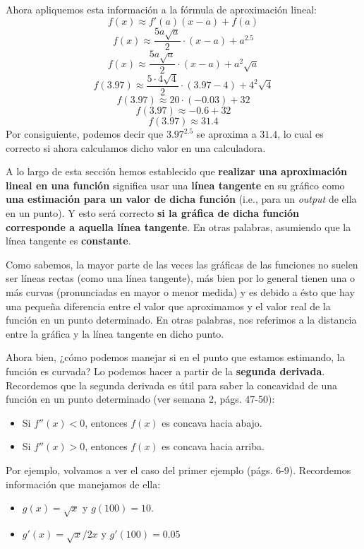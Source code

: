 \documentclass[12pt]{article}
\begin{document}
Ahora apliquemos esta información a la fórmula de aproximación lineal:
\[f(x) \approx f'(a)(x - a) + f(a)\]
\[f(x) \approx \frac{5a \sqrt{a}}{2} \cdot (x - a) + a^{2.5}\]
\[f(x) \approx \frac{5a \sqrt{a}}{2} \cdot (x - a) + a^{2}\sqrt{a}\]
\[f(3.97) \approx \frac{5 \cdot 4 \sqrt{4}}{2} \cdot (3.97 - 4) + 4^{2}\sqrt{4}\]
\[f(3.97) \approx 20 \cdot (-0.03) + 32\]
\[f(3.97) \approx -0.6 + 32\]
\[f(3.97) \approx 31.4\]
Por consiguiente, podemos decir que $3.97^{2.5}$ se aproxima a $31.4$, lo cual es correcto si ahora calculamos dicho valor en una calculadora.

A lo largo de esta sección hemos establecido que \textbf{realizar una aproximación lineal en una función} significa usar una \textbf{línea tangente} en su gráfico como \textbf{una estimación para un valor de dicha función} (i.e., para un \textit{output} de ella en un punto). Y esto será correcto \textbf{si la gráfica de dicha función corresponde a aquella línea tangente}. En otras palabras, asumiendo que la línea tangente es \textbf{constante}.

Como sabemos, la mayor parte de las veces las gráficas de las funciones no suelen ser líneas rectas (como una línea tangente), más bien por lo general tienen una o más curvas (pronunciadas en mayor o menor medida) y es debido a ésto que hay una pequeña diferencia entre el valor que aproximamos y el valor real de la función en un punto determinado. En otras palabras, nos referimos a la distancia entre la gráfica y la línea tangente en dicho punto.

Ahora bien, ¿cómo podemos manejar si en el punto que estamos estimando, la función es curvada? Lo podemos hacer a partir de la \textbf{segunda derivada}. Recordemos que la segunda derivada es útil para saber la concavidad de una función en un punto determinado (ver semana 2, págs. 47-50):

\begin{itemize}
\item Si $f''(x) < 0$, entonces $f(x)$ es concava hacia abajo.
\item Si $f''(x) > 0$, entonces $f(x)$ es concava hacia arriba.
\end{itemize}

Por ejemplo, volvamos a ver el caso del primer ejemplo (págs. 6-9). Recordemos información que manejamos de ella:

\newpage

\begin{itemize}
\item $g(x) = \sqrt{x}$ y $g(100) = 10$.
\item $g'(x) = \sqrt{x}/2x$ y $g'(100) = 0.05$
\end{itemize}
\end{document}
